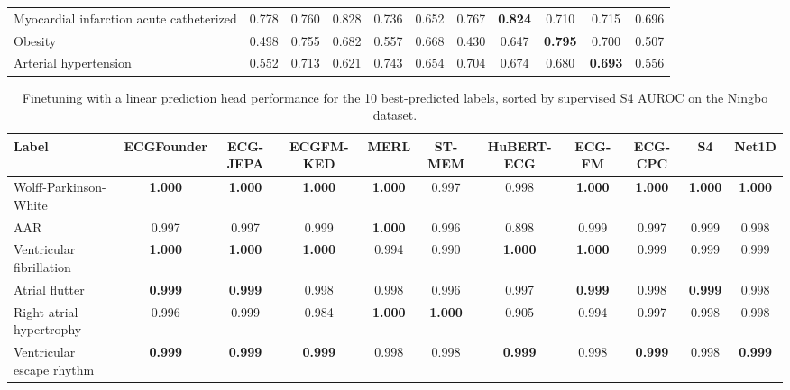 \documentclass{article}
\begin{document}
\begin{table}[htbp]
\begin{tabular}{lcccccccccc}
                        Myocardial infarction acute catheterized & 0.778 & 0.760 & 0.828 & 0.736 & 0.652 & 0.767 & \textbf{0.824} & 0.710 & 0.715 & 0.696 \\
                        Obesity & 0.498 & 0.755 & 0.682 & 0.557 & 0.668 & 0.430 & 0.647 & \textbf{0.795} & 0.700 & 0.507 \\
                        Arterial hypertension & 0.552 & 0.713 & 0.621 & 0.743 & 0.654 & 0.704 & 0.674 & 0.680 & \textbf{0.693} & 0.556 \\
                        \bottomrule
                    \end{tabular}
                    \label{tab:results_overview_ptb}
                \end{table}

                \begin{table}[htbp]
                    \centering
                    \tiny
                    \setlength{\tabcolsep}{2pt}
                    \caption{Finetuning with a linear prediction head performance for the 10 best-predicted labels, sorted by supervised S4 AUROC on the Ningbo dataset.}
                    \begin{tabular}{lcccccccccc}
                        \toprule
                        \textbf{Label} & \textbf{ECGFounder} & \textbf{ECG-JEPA} & \textbf{ECGFM-KED} & \textbf{MERL} & \textbf{ST-MEM} & \textbf{HuBERT-ECG} & \textbf{ECG-FM} & \textbf{ECG-CPC} & \textbf{S4} & \textbf{Net1D} \\
                        \midrule
                        Wolff-Parkinson-White & \textbf{1.000} & \textbf{1.000} & \textbf{1.000} & \textbf{1.000} & 0.997 & 0.998 & \textbf{1.000} & \textbf{1.000} & \textbf{1.000} & \textbf{1.000} \\
                        AAR & 0.997 & 0.997 & 0.999 & \textbf{1.000} & 0.996 & 0.898 & 0.999 & 0.997 & 0.999 & 0.998 \\
                        Ventricular fibrillation & \textbf{1.000} & \textbf{1.000} & \textbf{1.000} & 0.994 & 0.990 & \textbf{1.000} & \textbf{1.000} & 0.999 & 0.999 & 0.999 \\
                        Atrial flutter & \textbf{0.999} & \textbf{0.999} & 0.998 & 0.998 & 0.996 & 0.997 & \textbf{0.999} & 0.998 & \textbf{0.999} & 0.998 \\
                        Right atrial hypertrophy & 0.996 & 0.999 & 0.984 & \textbf{1.000} & \textbf{1.000} & 0.905 & 0.994 & 0.997 & 0.998 & 0.998 \\
                        Ventricular escape rhythm & \textbf{0.999} & \textbf{0.999} & \textbf{0.999} & 0.998 & 0.998 & \textbf{0.999} & 0.998 & \textbf{0.999} & 0.998 & \textbf{0.999} \\

\end{tabular}
\end{table}
\end{document}

